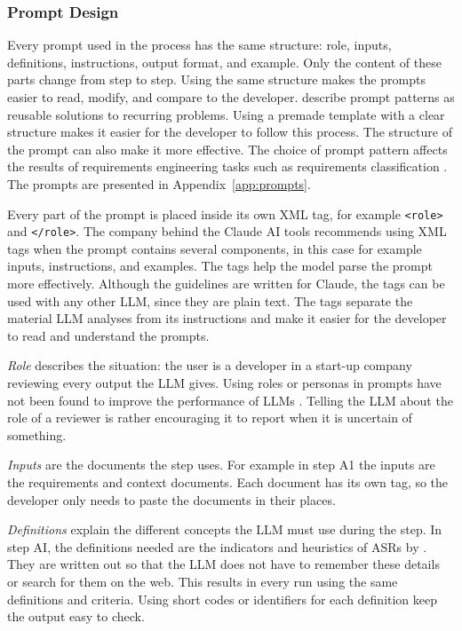 \subsubsection{Prompt Design}
\label{sec:prompt_design}

Every prompt used in the process has the same structure: role, inputs, definitions, instructions, output format, and example. Only the content of these parts change from step to step. Using the same structure makes the prompts easier to read, modify, and compare to the developer. \textcite{whitePromptPatternCatalog2023} describe prompt patterns as reusable solutions to recurring problems. Using a premade template with a clear structure makes it easier for the developer to follow this process. The structure of the prompt can also make it more effective. The choice of prompt pattern affects the results of requirements engineering tasks such as requirements classification \parencite{ronankiRequirementsEngineeringUsing2024}. The prompts are presented in Appendix~\ref{app:prompts}.

Every part of the prompt is placed inside its own XML tag, for example \texttt{<role>} and \texttt{</role>}. The company behind the Claude AI tools recommends using XML tags when the prompt contains several components, in this case for example inputs, instructions, and examples. The tags help the model parse the prompt more effectively. \parencite{anthropicUseXMLTags} Although the guidelines are written for Claude, the tags can be used with any other LLM, since they are plain text. The tags separate the material LLM analyses from its instructions and make it easier for the developer to read and understand the prompts.

\emph{Role} describes the situation: the user is a developer in a start-up company reviewing every output the LLM gives. Using roles or personas in prompts have not been found to improve the performance of LLMs \parencite{zhengWhenHelpfulAssistant2024}. Telling the LLM about the role of a reviewer is rather encouraging it to report when it is uncertain of something.

\emph{Inputs} are the documents the step uses. For example in step A1 the inputs are the requirements and context documents. Each document has its own tag, so the developer only needs to paste the documents in their places.

\emph{Definitions} explain the different concepts the LLM must use during the step. In step AI, the definitions needed are the indicators and heuristics of ASRs by \textcite{chenCharacterizingArchitecturallySignificant2013}. They are written out so that the LLM does not have to remember these details or search for them on the web. This results in every run using the same definitions and criteria. Using short codes or identifiers for each definition keep the output easy to check.

